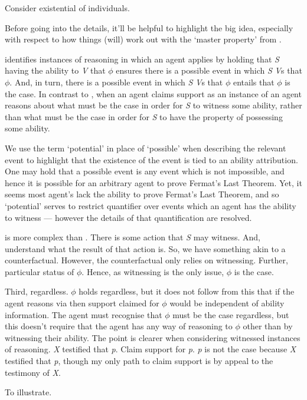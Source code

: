 \begin{note}[\WR{} def.]
{    Consider existential of individuals.
  }

  {
    \color{green}
    Before going into the details, it'll be helpful to highlight the big idea, especially with respect to how things (will) work out with the `master property' from \AR{}.
  }

  \WR{} identifies instances of reasoning in which an agent applies  by holding that \emph{S} having the ability to \emph{V} that \(\phi\) ensures there is a possible event in which \emph{S} \emph{V}s that \(\phi\).
  And, in turn, there is a possible event in which \emph{S} \emph{V}s that \(\phi\) entails that \(\phi\) is the case.
  In contrast to \AR{}, when an agent claims support as an instance of \WR{} an agent reasons about what must be the case in order for \emph{S} to witness some ability, rather than what must be the case in order for \emph{S} to have the property of possessing some ability.


  We use the term `potential' in place of `possible' when describing the relevant event to highlight that the existence of the event is tied to an ability attribution.
  One may hold that a possible event is any event which is not impossible, and hence it is possible for an arbitrary agent to prove Fermat's Last Theorem.
  Yet, it seems most agent's lack the ability to prove Fermat's Last Theorem, and so `potential' serves to restrict quantifier over events which an agent has the ability to witness --- however the details of that quantification are resolved.

  {
    \color{red}
    \WR{} is more complex than \AR{}.
    There is some action that \emph{S} may witness.
    And, understand what the result of that action is.
    So, we have something akin to a counterfactual.
    However, the counterfactual only relies on witnessing.
    Further, particular status of \(\phi\).
    Hence, as witnessing is the only issue, \(\phi\) is the case.

    Third, regardless.
    \(\phi\) holds regardless, but it does not follow from this that if the agent reasons via \WR{} then support claimed for \(\phi\) would be independent of ability information.
    The agent must recognise that \(\phi\) must be the case regardless, but this doesn't require that the agent has any way of reasoning to \(\phi\) other than by witnessing their ability.
    The point is clearer when considering witnessed instances of reasoning.
    \emph{X} testified that \emph{p}.
    Claim support for \emph{p}.
    \emph{p} is not the case because \emph{X} testified that \emph{p}, though my only path to claim support is by appeal to the testimony of \emph{X}.
  }
  To illustrate.


\end{note}
